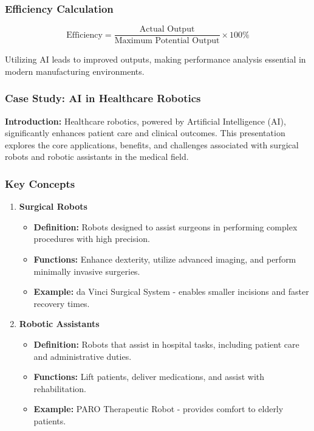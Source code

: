 \documentclass[aspectratio=169]{beamer}
\begin{document}
\begin{frame}[fragile]
    \frametitle{Efficiency Calculation}
    
    \begin{equation}
        \text{Efficiency} = \frac{\text{Actual Output}}{\text{Maximum Potential Output}} \times 100\%
    \end{equation}
    
    Utilizing AI leads to improved outputs, making performance analysis essential in modern manufacturing environments.
\end{frame}

\begin{frame}[fragile]
    \frametitle{Case Study: AI in Healthcare Robotics}
    
    \textbf{Introduction:} 
    Healthcare robotics, powered by Artificial Intelligence (AI), significantly enhances patient care and clinical outcomes. This presentation explores the core applications, benefits, and challenges associated with surgical robots and robotic assistants in the medical field.
\end{frame}

\begin{frame}[fragile]
    \frametitle{Key Concepts}
    
    \begin{enumerate}
        \item \textbf{Surgical Robots}
        \begin{itemize}
            \item \textbf{Definition:} Robots designed to assist surgeons in performing complex procedures with high precision.
            \item \textbf{Functions:} Enhance dexterity, utilize advanced imaging, and perform minimally invasive surgeries.
            \item \textbf{Example:} da Vinci Surgical System - enables smaller incisions and faster recovery times.
        \end{itemize}
        
        \item \textbf{Robotic Assistants}
        \begin{itemize}
            \item \textbf{Definition:} Robots that assist in hospital tasks, including patient care and administrative duties.
            \item \textbf{Functions:} Lift patients, deliver medications, and assist with rehabilitation.
            \item \textbf{Example:} PARO Therapeutic Robot - provides comfort to elderly patients.
        \end{itemize}
    \end{enumerate}
\end{frame}
\end{document}

